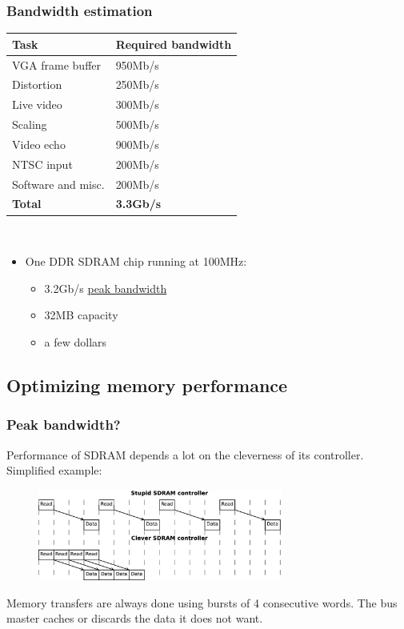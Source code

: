\documentclass{beamer}
\begin{document}
\frame
{
  \frametitle{Bandwidth estimation}

  \begin{tabular}{|l|l|}
  \hline
  \textbf{Task} & \textbf{Required bandwidth} \\
  \hline
  VGA frame buffer & 950Mb/s \\
  \hline
  Distortion & 250Mb/s \\
  \hline
  Live video & 300Mb/s \\
  \hline
  Scaling & 500Mb/s \\
  \hline
  Video echo & 900Mb/s \\
  \hline
  NTSC input & 200Mb/s \\
  \hline
  Software and misc. & 200Mb/s \\
  \hline
  \textbf{Total} & \textbf{3.3Gb/s} \\
  \hline
  \end{tabular}\\

  \begin{itemize}
  \item One DDR SDRAM chip running at 100MHz:
  \begin{itemize}
  \item 3.2Gb/s \underline{peak bandwidth}
  \item 32MB capacity
  \item a few dollars
  \end{itemize}
  \end{itemize}
}

\subsection{Optimizing memory performance}
\frame
{
  \frametitle{Peak bandwidth?}

  Performance of SDRAM depends a lot on the cleverness of its controller. Simplified example:

  \begin{figure}[H]
  \includegraphics[height=30mm]{memlatency.eps}
  \end{figure}

  Memory transfers are always done using bursts of 4 consecutive words. The bus master caches or discards the data it does not want.
}
\end{document}
